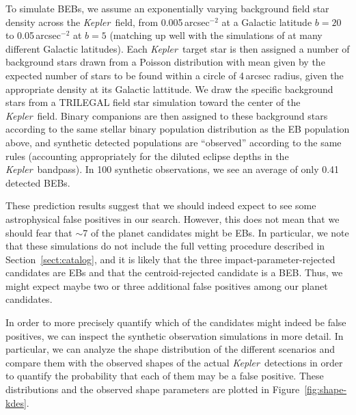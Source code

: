 \documentclass[manuscript, letterpaper]{aastex6}
\newcommand{\project}[1]{\textsl{#1}}
\newcommand{\kepler}{\project{Kepler}}
\newcommand{\dfmfigref}[1]{\ref{fig:#1}}
\newcommand{\dfmFig}[1]{Figure~\dfmfigref{#1}}
\newcommand{\dfmfig}[1]{\dfmFig{#1}}
\newcommand{\sectionname}{Section}
\newcommand{\sectref}[1]{\ref{sect:#1}}
\newcommand{\Sect}[1]{\sectionname~\sectref{#1}}
\newcommand{\sect}[1]{\Sect{#1}}
\begin{document}
To simulate BEBs, we assume an exponentially varying background field star
density across the \kepler\ field, from 0.005\,arcsec$^{-2}$ at a Galactic
latitude $b=20$ to 0.05\,arcsec$^{-2}$ at $b=5$ (matching up well with the
simulations of \citet{Morton:2011} at many different Galactic latitudes). Each
\kepler\ target star is then assigned a number of background stars drawn from
a Poisson distribution with mean given by the expected number of stars to be
found within a circle of 4\,arcsec radius, given the  appropriate density at
its Galactic lattitude.   We draw the specific background stars from a
TRILEGAL \citep{Girardi:2005}  field star simulation toward the center of the
\kepler\ field.  Binary companions are then assigned to these background stars
according to the same stellar binary population distribution as the EB
population above, and synthetic detected populations  are ``observed''
according to the same rules (accounting appropriately for the diluted eclipse
depths in the \kepler\ bandpass).  In 100 synthetic observations, we see an
average of only 0.41 detected BEBs.

These prediction results suggest that we should indeed expect to see some
astrophysical false positives in our search.  However, this does not mean that  we
should fear that $\sim$7 of the planet candidates might be EBs. In particular,
we note that these simulations do not include the full vetting procedure
described in \sect{catalog}, and it is likely that the three impact-parameter-rejected
candidates are EBs and that the centroid-rejected candidate is a BEB.  Thus,
we might expect maybe two or three additional false positives among our planet
candidates.

In order to more precisely quantify which of the candidates might indeed be false
positives, we can inspect the synthetic observation simulations in more detail. In
particular, we can analyze the shape distribution of the different scenarios and
compare them with the observed shapes of the actual \kepler\ detections in order
to quantify the probability that each of them may be a false positive.
These distributions and the observed shape parameters are plotted in
\dfmfig{shape-kdes}.
\end{document}
